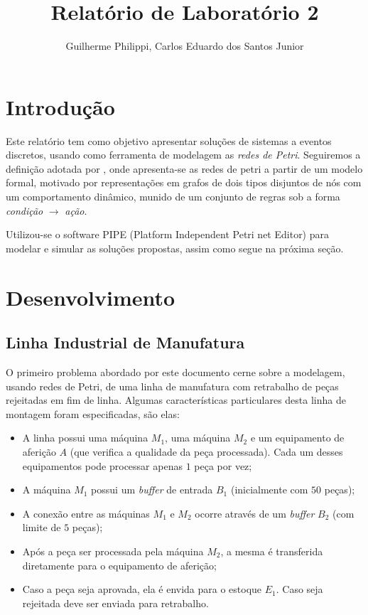 \documentclass[a4paper,12pt]{article}
\title{Relatório de Laboratório 2}
\author{Guilherme Philippi, Carlos Eduardo dos Santos Junior}
\begin{document}
\maketitle
\tableofcontents

\section{Introdução}
Este relatório tem como objetivo apresentar soluções de sistemas a eventos discretos, usando como ferramenta de modelagem as \textit{redes de Petri}. Seguiremos a definição adotada por \cite{cardoso1997redes}, onde apresenta-se as redes de petri a partir de um modelo formal, motivado por representações em grafos de dois tipos disjuntos de nós com um comportamento dinâmico, munido de um conjunto de regras sob a forma \textit{condição} $\longrightarrow$ \textit{ação}.

Utilizou-se o software PIPE (Platform Independent Petri net Editor) \cite{dias2007ferramentas} para modelar e simular as soluções propostas, assim como segue na próxima seção.

\section{Desenvolvimento}
\subsection{Linha Industrial de Manufatura}

O primeiro problema abordado por este documento cerne sobre a modelagem, usando redes de Petri, de uma linha de manufatura com retrabalho de peças rejeitadas em fim de linha. Algumas características particulares desta linha de montagem foram especificadas, são elas:
\begin{itemize}
	\item A linha possui uma máquina $M_1$, uma máquina $M_2$ e um equipamento de aferição $A$ (que verifica a qualidade da peça processada). Cada um desses equipamentos pode processar apenas $1$ peça por vez;
	\item A máquina $M_1$ possui um \textit{buffer} de entrada $B_1$ (inicialmente com $50$ peças);
	\item A conexão entre as máquinas $M_1$ e $M_2$ ocorre através de um \textit{buffer} $B_2$ (com limite de $5$ peças);
	\item Após a peça ser processada pela máquina $M_2$, a mesma é transferida diretamente para o equipamento de aferição;
	\item Caso a peça seja aprovada, ela é envida para o estoque $E_1$. Caso seja rejeitada deve ser enviada para retrabalho. 
\end{itemize}
\end{document}
